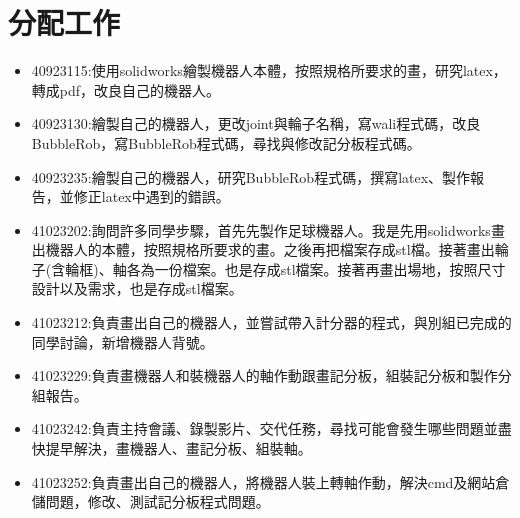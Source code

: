 \chapter{分配工作}
\begin{itemize}
\item 40923115:使用solidworks繪製機器人本體，按照規格所要求的畫，研究latex，轉成pdf，改良自己的機器人。
\item 40923130:繪製自己的機器人，更改joint與輪子名稱，寫wali程式碼，改良BubbleRob，寫BubbleRob程式碼，尋找與修改記分板程式碼。
\item 40923235:繪製自己的機器人，研究BubbleRob程式碼，撰寫latex、製作報告，並修正latex中遇到的錯誤。
\item 41023202:詢問許多同學步驟，首先先製作足球機器人。我是先用solidworks畫出機器人的本體，按照規格所要求的畫。之後再把檔案存成stl檔。接著畫出輪子(含輪框)、軸各為一份檔案。也是存成stl檔案。接著再畫出場地，按照尺寸設計以及需求，也是存成stl檔案。 
\item 41023212:負責畫出自己的機器人，並嘗試帶入計分器的程式，與別組已完成的同學討論，新增機器人背號。 
\item 41023229:負責畫機器人和裝機器人的軸作動跟畫記分板，組裝記分板和製作分組報告。
\item 41023242:負責主持會議、錄製影片、交代任務，尋找可能會發生哪些問題並盡快提早解決，畫機器人、畫記分板、組裝軸。
\item 41023252:負責畫出自己的機器人，將機器人裝上轉軸作動，解決cmd及網站倉儲問題，修改、測試記分板程式問題。
\end{itemize}
\newpage
